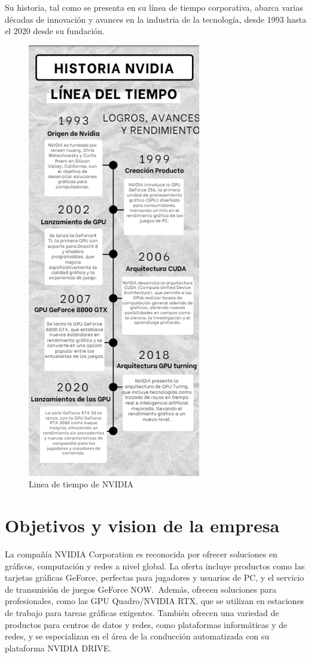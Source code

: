 \documentclass[letterpaper, 12pt]{article}
\begin{document}
Su historia, tal como se presenta en su línea de tiempo
corporativa, abarca varias décadas de innovación y avances
en la industria de la tecnología, desde 1993 hasta el 2020
desde su fundación.

\begin{figure}[H]
      \begin{center}
            \includegraphics[width=.5\linewidth]{./Images/LineaTiempo.png}
            \caption{Linea de tiempo de NVIDIA}
      \end{center}
\end{figure}

\section{Objetivos y vision de la empresa}

La compañía NVIDIA Corporation es reconocida por ofrecer soluciones
en gráficos, computación y redes a nivel global. La oferta incluye
productos como las tarjetas gráficas GeForce, perfectas para
jugadores y usuarios de PC, y el servicio de transmisión de
juegos GeForce NOW.~Además, ofrecen soluciones para
profesionales, como las GPU Quadro/NVIDIA RTX, que se
utilizan en estaciones de trabajo para tareas gráficas
exigentes. También ofrecen una variedad de productos
para centros de datos y redes, como plataformas
informáticas y de redes, y se especializan en el área
de la conducción automatizada con su plataforma NVIDIA DRIVE.\@{}
\end{document}
